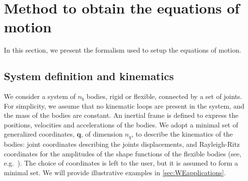 \documentclass[wes, manuscript]{copernicus}
\renewcommand{\v}[1]{\boldsymbol{#1}}
\begin{document}




\section{Method to obtain the equations of motion}
\label{sec:method}

In this section, we present the formalism used to setup the equations of motion. 

\subsection{System definition and kinematics}
We consider a system of $n_b$ bodies, rigid or flexible, connected by a set of joints.
    For simplicity, we assume that no kinematic loops are present in the system, and the mass of the bodies are constant.
    An inertial frame is defined to express the positions, velocities and accelerations of the bodies.
    We adopt a minimal set of generalized coordinates, $\v{q}$, of dimension $n_q$, to describe the kinematics of the bodies: joint coordinates describing the joints displacements, and Rayleigh-Ritz coordinates for the amplitudes of the shape functions of the flexible bodies (see, e.g.~\cite{branlard:2019flex}).
The choice of coordinates is left to the user, but it is assumed to form a minimal set.
We will provide illustrative examples in \autoref{sec:WEapplications}.
\end{document}
